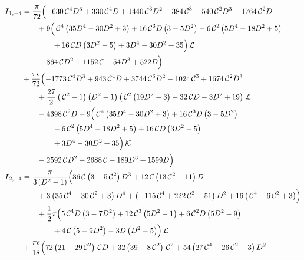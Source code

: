 \documentclass[prd,preprintnumbers,nofootinbib,superscriptaddress,onecolumn,preprint]{revtex4-1}
\newcommand\3[1]{\boldsymbol{#1}}
\newcommand{\cosfun}{\ensuremath{\mathcal{ \, C}}}
\newcommand{\llun}{\ensuremath{ \mathcal{\, L}}}
\newcommand{\kkun}{\ensuremath{ \mathcal{\, K}}}
\begin{document}
\begin{align}
	        I{}_{1,-4}  &{} = \frac{\pi}{72} \Bigl( -630 \cosfun^4 D^3+330 \cosfun^4 D+1440 \cosfun^3 D^2-384 \cosfun^3+540 \cosfun^2 D^3-1764 \cosfun^2 D \nonumber \\ 
                &{} \qquad +9 \Bigl( \cosfun^4 \left(35 D^4-30 D^2+3\right)+16 \cosfun^3 D \left(3-5 D^2\right)-6 \cosfun^2 \left(5 D^4-18 D^2+5\right) \nonumber \\ 
                &{} \qquad \qquad +16 \cosfun D \left(3 D^2-5\right)+3 D^4-30 D^2+35 \Bigr) \llun \nonumber \\
                &{} \qquad -864 \cosfun D^2+1152 \cosfun-54 D^3+522 D \Bigr) \nonumber \\
			    &{} +\frac{\pi \epsilon}{72} \Bigl(-1773 \cosfun^4 D^3+943 \cosfun^4 D+3744 \cosfun^3 D^2-1024 \cosfun^3+1674 \cosfun^2 D^3 \nonumber \\
                &{} \qquad +\frac{27}{2} \left(\cosfun^2-1\right) \left(D^2-1\right) \left(\cosfun^2 \left(19 D^2-3\right)-32 \cosfun D-3 D^2+19\right) \llun \nonumber \\
                &{} \qquad -4398 \cosfun^2 D+9 \Bigl( \cosfun^4 \left(35 D^4-30 D^2+3\right)+16 \cosfun^3 D \left(3-5 D^2\right) \nonumber \\
                &{} \qquad \qquad -6 \cosfun^2 \left(5 D^4-18 D^2+5\right)+16 \cosfun D \left(3 D^2-5\right) \nonumber \\ 
                &{} \qquad \qquad +3 D^4-30 D^2+35 \Bigr) \kkun \nonumber \\ 
									 &{} \qquad -2592 \cosfun D^2+2688 \cosfun-189 D^3+1599 D \Bigr) \\
	        I{}_{2,-4}  &{} = \frac{\pi}{3 \left(D^2-1\right)}  \Bigl( 36 \cosfun \left(3-5 \cosfun^2\right) D^3+12 \cosfun \left(13 \cosfun^2-11\right) D \nonumber \\ 
                &{} \qquad +3 \left(35 \cosfun^4-30 \cosfun^2+3\right) D^4 +\left(-115 \cosfun^4+222 \cosfun^2-51\right) D^2+16 \left(\cosfun^4-6 \cosfun^2+3\right) \Bigr) \nonumber \\
                &{} \qquad +\frac{1}{2} \pi  \Bigl( 5 \cosfun^4 D \left(3-7 D^2\right)+12 \cosfun^3 \left(5 D^2-1\right)+6 \cosfun^2 D \left(5 D^2-9\right) \nonumber \\ 
                &{} \qquad \qquad +4 \cosfun \left(5-9 D^2\right)-3 D \left(D^2-5\right) \Bigr) \llun \nonumber \\
                &{} + \frac{\pi \epsilon}{18} \Bigl( 72 \left(21-29 \cosfun^2\right) \cosfun D+32 \left(39-8 \cosfun^2\right) \cosfun^2+54 \left(27 \cosfun^4-26 \cosfun^2+3\right) D^2 \nonumber \\ 

\end{align}
\end{document}
